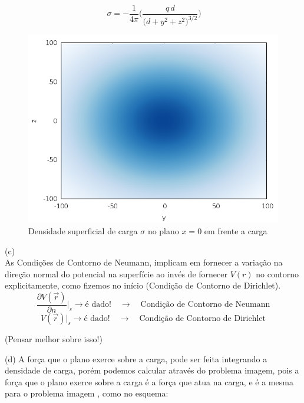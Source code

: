 \documentclass[a4paper,11pt]{exam}
\begin{document}
{	\[\ \sigma = -\frac{1}{4 \pi} \Bigg( \frac{q\,d}{\Big(d + y^2 + z^2 \Big)^{3/2}} \Bigg)\] 
	
	\begin{figure}[h]
		\centering
		\includegraphics[scale=0.7]{Sigma.png}
		\caption{ Densidade superficial de carga $\sigma$ no plano $x=0$ em frente a carga}
	\end{figure}
	(c)
	\\
	As Condições de Contorno de Neumann, implicam em fornecer a variação na direção normal do potencial na superfície ao invés de fornecer $V(r)$ no contorno explicitamente, como fizemos no início (Condição de Contorno de Dirichlet).
	\[\frac{\partial V(\vec{r})}{\partial n} \Bigg|_s \to \text{é dado!}\quad \to \quad \text{Condição de Contorno de Neumann} \]
	\[V(\vec{r}) \Bigg|_s \to \text{é dado!}\quad \to \quad \text{Condição de Contorno de Dirichlet} \]
	
	(Pensar melhor sobre isso!)
	
	(d)
	A força que o plano exerce sobre a carga, pode ser feita integrando a densidade de carga, porém podemos calcular através do problema imagem, pois a força que o plano exerce sobre a carga é a força que atua na carga, e é a mesma para o problema imagem , como no esquema:
	
	\begin{center}
\end{center}}
\end{document}
